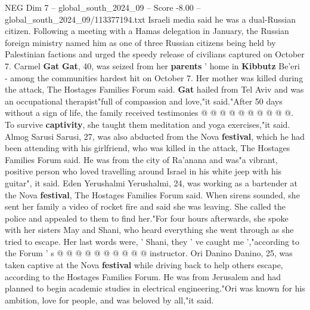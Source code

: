 \begin{textsample}{NEG Dim 7 – global\_south\_2024\_09 – Score -8.00 – global\_south\_2024\_09/113377194.txt}
Israeli media said he was a dual-Russian citizen.
Following a meeting with a Hamas delegation in January, the Russian foreign ministry named him as one of three Russian citizens being held by Palestinian factions and urged the speedy release of civilians captured on October 7.
Carmel \textbf{Gat} \textbf{Gat}, 40, was seized from her \textbf{parents} ' home in \textbf{Kibbutz} Be'eri - among the communities hardest hit on October 7.
Her mother was killed during the attack, The Hostages Families Forum said. \textbf{Gat} hailed from Tel Aviv and was an occupational therapist"full of compassion and love,"it said."After 50 days without a sign of life, the family received testimonies @ @ @ @ @ @ @ @ @ @.
To survive \textbf{captivity}, she taught them meditation and yoga exercises,"it said.
Almog Sarusi Sarusi, 27, was also abducted from the Nova \textbf{festival}, which he had been attending with his girlfriend, who was killed in the attack, The Hostages Families Forum said.
He was from the city of Ra'anana and was"a vibrant, positive person who loved travelling around Israel in his white jeep with his guitar", it said.
Eden Yerushalmi Yerushalmi, 24, was working as a bartender at the Nova \textbf{festival}, The Hostages Families Forum said.
When sirens sounded, she sent her family a video of rocket fire and said she was leaving.
She called the police and appealed to them to find her."For four hours afterwards, she spoke with her sisters May and Shani, who heard everything she went through as she tried to escape.
Her last words were, ' Shani, they ' ve caught me ',"according to the Forum ' s @ @ @ @ @ @ @ @ @ @ instructor.
Ori Danino Danino, 25, was taken captive at the Nova \textbf{festival} while driving back to help others escape, according to the Hostages Families Forum.
He was from Jerusalem and had planned to begin academic studies in electrical engineering."Ori was known for his ambition, love for people, and was beloved by all,"it said.

\end{textsample}

